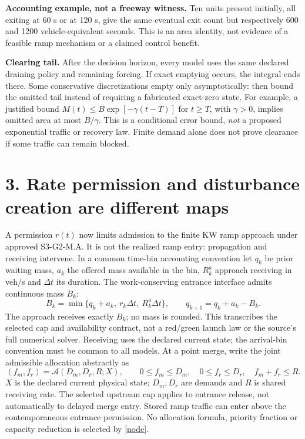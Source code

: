 \documentclass[11pt,a4paper]{article}
\begin{document}
\textbf{Accounting example, not a freeway witness.} Ten units present initially,
all exiting at 60 s or at 120 s, give the same eventual exit count but respectively
600 and 1200 vehicle-equivalent seconds. This is an area identity, not evidence
of a feasible ramp mechanism or a claimed control benefit.

\textbf{Clearing tail.} After the decision horizon, every model uses the same
declared draining policy and remaining forcing. If exact emptying occurs, the
integral ends there. Some conservative discretizations empty only asymptotically:
then bound the omitted tail instead of requiring a fabricated exact-zero state.
For example, a justified bound $M(t)\le B\exp[-\gamma(t-T)]$ for $t\ge T$,
with $\gamma>0$, implies omitted area at most $B/\gamma$. This is a conditional
error bound, \emph{not} a proposed exponential traffic or recovery law.
Finite demand alone does not prove clearance if some traffic can remain blocked.

\newpage
\section*{3. Rate permission and disturbance creation are different maps}
A permission $r(t)$ now limits admission to the finite KW ramp approach under
approved S3-G2-M.A. It is not the realized ramp entry: propagation and receiving
intervene. In a common time-bin accounting convention let $q_k$ be prior
waiting mass, $a_k$ the offered mass available in the bin, $R^a_k$ approach
receiving in veh/s and $\Delta t$ its duration. The work-conserving entrance
interface admits continuous mass $B_k$:
\begin{equation}
B_k=\min\{q_k+a_k,\ r_k\Delta t,\ R^a_k\Delta t\},\qquad
q_{k+1}=q_k+a_k-B_k. \label{admission}
\end{equation}
The approach receives exactly $B_k$; no mass is rounded. This transcribes the
selected cap and availability contract, not a red/green launch law or the
source's full numerical solver. Receiving uses the declared current state;
the arrival-bin convention must be common to all models.
At a point merge, write the joint admissible allocation abstractly as
\begin{equation}
(f_m,f_r)=\mathcal A(D_m,D_r,R;X),\qquad
0\le f_m\le D_m,\quad 0\le f_r\le D_r,\quad f_m+f_r\le R. \label{node}
\end{equation}
$X$ is the declared current physical state; $D_m,D_r$ are demands and $R$ is
shared receiving rate. The selected upstream cap applies to entrance release,
not automatically to delayed merge entry. Stored ramp traffic can enter above
the contemporaneous entrance permission. No allocation formula,
priority fraction or capacity reduction is selected by \eqref{node}.
\end{document}
